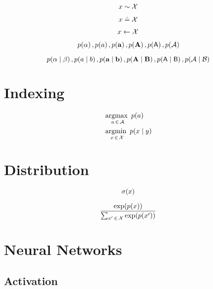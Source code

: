 \documentclass[a4paper,11pt]{article}
\begin{document}
\begin{equation*}
	x\sim \mathcal{X}
\end{equation*}

\begin{equation*}
	x\doteq \mathcal{X}
\end{equation*}

\begin{equation*}
	x\leftarrow \mathcal{X}
\end{equation*}

\begin{equation*}
	p\!\left(\alpha\right),p\!\left(a\right), p\!\left(\mathbf{a}\right), p\!\left(\mathbf{A}\right), p\!\left(\mathsf{A}\right), p\!\left(\mathcal{A}\right)
\end{equation*}

\begin{equation*}
	p\!\left(\alpha\mid \beta\right),p\!\left(a\mid b\right), p\!\left(\mathbf{a}\mid \mathbf{b}\right), p\!\left(\mathbf{A}\mid \mathbf{B}\right), p\!\left(\mathsf{A}\mid \mathsf{B}\right), p\!\left(\mathcal{A}\mid \mathcal{B}\right)
\end{equation*}

\section{Indexing} %
\label{sec:indexing}

\begin{align*}
	& \operatorname*{\mathrm{argmax}~}_{a\,\in\,\mathcal{A}}{p\!\left(a\right)} \\
	& \operatorname*{\mathrm{argmin}~}_{x\,\in\,\mathcal{X}}{p\!\left(x\mid y\right)} \\
\end{align*}

\section{Distribution} %
\label{sec:distribution}

\begin{equation*}
	\sigma\!\left(x\right)
\end{equation*}

\begin{equation*}
	\dfrac{\exp\!\left(p\!\left(x\right)\right)}{\sum_{x^{\mathrm{\prime}}\,\in\,\mathcal{X}} \exp\!\left(p\!\left(x^{\mathrm{\prime}}\right)\right)}
\end{equation*}



\section{Neural Networks} %
\label{sec:neural_networks}

\subsection{Activation} %
\label{sub:activation}
\end{document}
